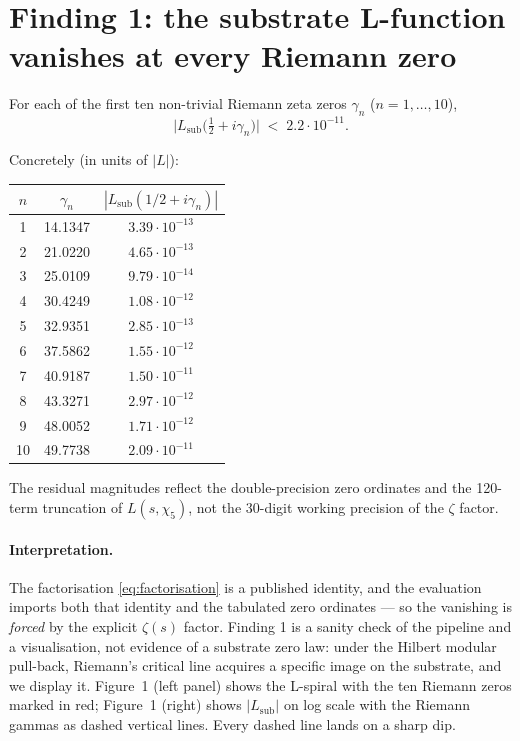 \documentclass[11pt,a4paper]{article}
\newcommand{\Lsub}{L_{\mathrm{sub}}}
\begin{document}
\section{Finding 1: the substrate L-function vanishes at every
Riemann zero}
\label{sec:finding1}

\begin{findingbox}[title=Finding 1]
For each of the first ten non-trivial Riemann zeta zeros
$\gamma_n$ ($n = 1, \ldots, 10$),
\[
  \bigl|\Lsub\bigl(\tfrac{1}{2} + i \gamma_n\bigr)\bigr| \;<\; 2.2 \cdot 10^{-11}.
\]
\end{findingbox}

Concretely (in units of $|L|$):
\begin{center}\small
\begin{tabular}{ccc}
\toprule
$n$ & $\gamma_n$ & $|\Lsub(1/2 + i\gamma_n)|$ \\
\midrule
1  & 14.1347 & $3.39 \cdot 10^{-13}$ \\
2  & 21.0220 & $4.65 \cdot 10^{-13}$ \\
3  & 25.0109 & $9.79 \cdot 10^{-14}$ \\
4  & 30.4249 & $1.08 \cdot 10^{-12}$ \\
5  & 32.9351 & $2.85 \cdot 10^{-13}$ \\
6  & 37.5862 & $1.55 \cdot 10^{-12}$ \\
7  & 40.9187 & $1.50 \cdot 10^{-11}$ \\
8  & 43.3271 & $2.97 \cdot 10^{-12}$ \\
9  & 48.0052 & $1.71 \cdot 10^{-12}$ \\
10 & 49.7738 & $2.09 \cdot 10^{-11}$ \\
\bottomrule
\end{tabular}
\end{center}

The residual magnitudes reflect the double-precision zero
ordinates and the 120-term truncation of $L(s,\chi_5)$, not the
30-digit working precision of the $\zeta$ factor.

\paragraph{Interpretation.} The factorisation
\eqref{eq:factorisation} is a published identity, and the
evaluation imports both that identity and the tabulated zero
ordinates --- so the vanishing is \emph{forced} by the explicit
$\zeta(s)$ factor. Finding 1 is a sanity check of the pipeline
and a visualisation, not evidence of a substrate zero law: under
the Hilbert modular pull-back, Riemann's critical line acquires a
specific image on the substrate, and we display it.
Figure~1 (left panel) shows the L-spiral with the ten Riemann
zeros marked in red; Figure~1 (right) shows $|\Lsub|$ on log scale
with the Riemann gammas as dashed vertical lines. Every dashed
line lands on a sharp dip.
\end{document}
